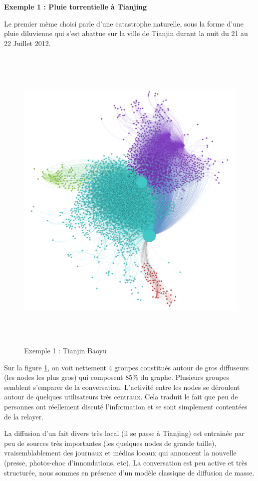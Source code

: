 \textbf{Exemple 1 : Pluie torrentielle à Tianjing}

Le premier mème choisi parle d{\textquoteright}une catastrophe naturelle, sous la forme d{\textquoteright}une pluie diluvienne qui s{\textquoteright}est abattue sur la ville de Tianjin durant la nuit du 21 au 22 Juillet 2012.

\begin{figure}[htbp]
    \centering
    \includegraphics[width=6in,height=6in]{figures/chap3/chapitre3-img17.png}
    \caption{Exemple 1 : Tianjin Baoyu}
    \label{fig:graph-tianjin}
\end{figure}

Sur la figure \ref{fig:graph-tianjin}, on voit nettement 4 groupes constitués autour de gros diffuseurs (les nodes les plus gros) qui composent 85\% du graphe. Plusieurs groupes semblent s{\textquoteright}emparer de la conversation. L'activité entre les nodes se déroulent autour de quelques utilisateurs très centraux. Cela traduit le fait que peu de personnes ont réellement discuté l{\textquoteright}information et se sont simplement contentées de la relayer.


La diffusion d{\textquoteright}un fait divers très local (il se passe à Tianjing) est entrainée par peu de sources très importantes (les quelques nodes de grande taille), vraisemblablement des journaux et médias locaux qui annoncent la nouvelle (presse, photos-choc d{\textquoteright}innondations, etc). La conversation est peu active et très structurée, nous sommes en présence d{\textquoteright}un modèle classique de diffusion de masse.

